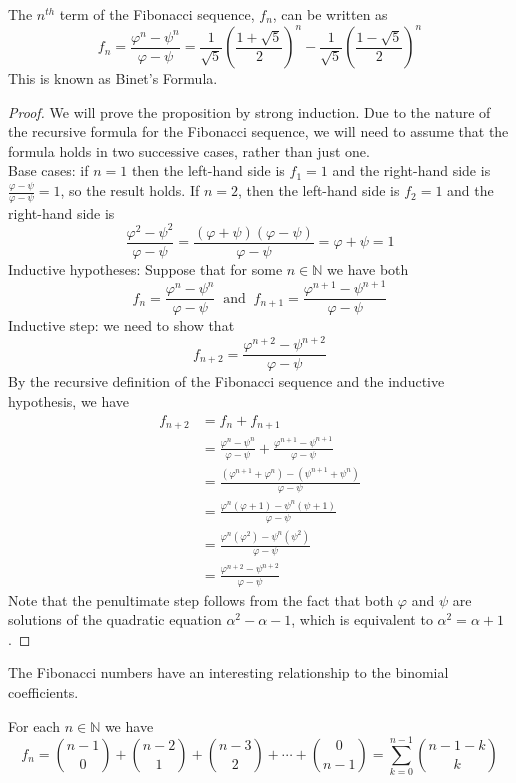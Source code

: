 \documentclass[handout]{ximera}
\begin{document}
\begin{proposition}
The $n^{th}$ term of the Fibonacci sequence, $f_n$, can be written as 
\[
f_n = \frac{\varphi^n - \psi^n}{\varphi - \psi} = 
\frac{1}{\sqrt 5} \left(\frac{1+\sqrt 5}{2}\right)^n - \frac{1}{\sqrt 5} \left(\frac{1-\sqrt 5}{2}\right)^n
\]
This is known as Binet's Formula.
\end{proposition}
\begin{proof}
We will prove the proposition by strong induction. Due to the nature of the recursive formula for the Fibonacci sequence, 
we will need to assume that the formula holds in two successive cases, rather than just one.\\
Base cases: if $n=1$ then the left-hand side is $f_1 =1$ and the right-hand side is $\frac{\varphi - \psi}{\varphi - \psi} = 1$, 
so the result holds. If $n=2$, then the left-hand side is $f_2 =1$ and the right-hand side is
\[
\frac{\varphi^2 - \psi^2}{\varphi - \psi} =\frac{(\varphi + \psi)(\varphi - \psi)}{\varphi - \psi} = \varphi + \psi = 1
\]
Inductive hypotheses: Suppose that for some $n \in \mathbb{N}$ we have both
\[
f_n = \frac{\varphi^n - \psi^n}{\varphi - \psi} \;\; \text{and} \;\; f_{n+1} = \frac{\varphi^{n+1} - \psi^{n+1}}{\varphi - \psi}
\]
Inductive step: we need to show that
\[
f_{n+2} = \frac{\varphi^{n+2} - \psi^{n+2}}{\varphi - \psi}
\]
By the recursive definition of the Fibonacci sequence and the inductive hypothesis, we have
\begin{align*}
f_{n+2} &= f_{n} + f_{n+1}\\
  & = \frac{\varphi^n - \psi^n}{\varphi - \psi} + \frac{\varphi^{n+1} - \psi^{n+1}}{\varphi - \psi}\\
  &= \frac{(\varphi^{n+1} + \varphi^n) - (\psi^{n+1}+ \psi^n)}{\varphi - \psi}\\
  &= \frac{\varphi^n(\varphi + 1) - \psi^n(\psi + 1 )}{\varphi - \psi}\\
  &= \frac{\varphi^n(\varphi ^2) - \psi^n(\psi^2 )}{\varphi - \psi}\\
  &= \frac{\varphi^{n+2}  - \psi^{n+2}}{\varphi - \psi}
\end{align*}
Note that the penultimate step follows from the fact that both $\varphi$ and $\psi$ are solutions of the quadratic equation
$\alpha^2 - \alpha - 1$, which is equivalent to $\alpha^2 = \alpha + 1$.
\end{proof}


The Fibonacci numbers have an interesting relationship to the binomial coefficients.

\begin{proposition}
For each $n \in \mathbb{N}$ we have
\[
f_n = \binom{n-1}{0} + \binom{n-2}{1} + \binom{n-3}{2} + \cdots + \binom{0}{n-1} = \sum_{k=0}^{n-1} \binom{n-1-k}{k}
\]

\end{proposition}
\end{document}
